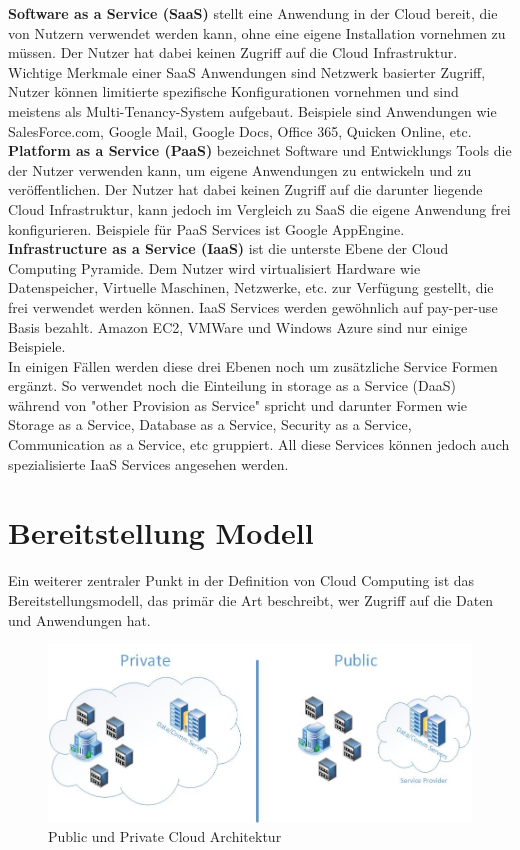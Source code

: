 \textbf{Software as a Service (SaaS)} stellt eine Anwendung in der Cloud bereit, die von Nutzern verwendet werden kann, ohne eine eigene Installation vornehmen zu müssen. Der Nutzer hat dabei keinen Zugriff auf die Cloud Infrastruktur. Wichtige Merkmale einer SaaS Anwendungen sind Netzwerk basierter Zugriff, Nutzer können limitierte spezifische Konfigurationen vornehmen und sind meistens als Multi-Tenancy-System aufgebaut. Beispiele sind Anwendungen wie SalesForce.com, Google Mail, Google Docs, Office 365, Quicken Online, etc.
\\

\textbf{Platform as a Service (PaaS)} bezeichnet Software und Entwicklungs Tools die der Nutzer verwenden kann, um eigene Anwendungen zu entwickeln und zu veröffentlichen. Der Nutzer hat dabei keinen Zugriff auf die darunter liegende Cloud Infrastruktur, kann jedoch im Vergleich zu SaaS die eigene Anwendung frei konfigurieren. Beispiele für PaaS Services ist Google AppEngine.
\\

\textbf{Infrastructure as a Service (IaaS)} ist die unterste Ebene der Cloud Computing Pyramide. Dem Nutzer wird virtualisiert Hardware wie Datenspeicher, Virtuelle Maschinen, Netzwerke, etc. zur Verfügung gestellt, die frei verwendet werden können. IaaS Services werden gewöhnlich auf pay-per-use Basis bezahlt. Amazon EC2, VMWare und Windows Azure sind nur einige Beispiele.
\\

In einigen Fällen werden diese drei Ebenen noch um zusätzliche Service Formen ergänzt. So verwendet \cite[S. 28]{Tharam.2010} noch die Einteilung in storage as a Service (DaaS) während \cite[S. 123]{Mahmood.2011} von "other Provision as Service" spricht und darunter Formen wie Storage as a Service, Database as a Service, Security as a Service, Communication as a Service, etc gruppiert. All diese Services können jedoch auch spezialisierte IaaS Services angesehen werden.


\section{Bereitstellung Modell}\label{bereitstellung}
Ein weiterer zentraler Punkt in der Definition von Cloud Computing ist das Bereitstellungsmodell, das primär die Art beschreibt, wer Zugriff auf die Daten und Anwendungen hat.

	\begin{figure}[h]
		\centering
		\includegraphics[width=0.9\linewidth]{images/private_public_cloud}
		\caption{Public und Private Cloud Architektur}
		\label{fig:PublicPrivateCloud}
	\end{figure}

